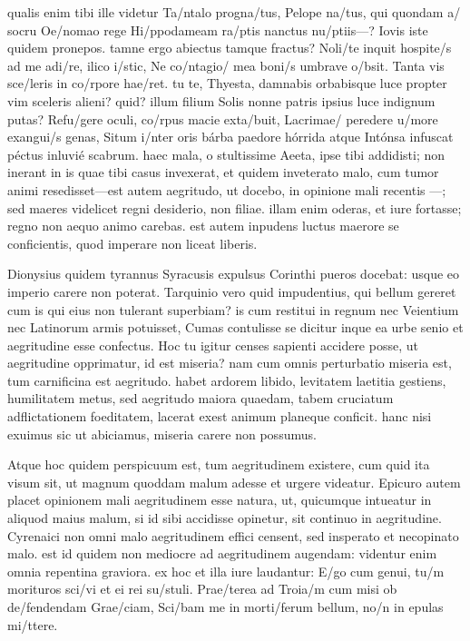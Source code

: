  qualis enim tibi ille videtur Ta/ntalo progna/tus, Pelope na/tus, qui quondam a/ socru Oe/nomao rege Hi/ppodameam ra/ptis nanctus nu/ptiis—? Iovis iste quidem pronepos. tamne ergo abiectus tamque fractus? Noli/te inquit hospite/s ad me adi/re, ilico i/stic, Ne co/ntagio/ mea boni/s umbrave o/bsit. Tanta vis sce/leris in co/rpore hae/ret. tu te, Thyesta, damnabis orbabisque luce propter vim sceleris alieni? quid? illum filium Solis nonne patris ipsius luce indignum putas? Refu/gere oculi, co/rpus macie exta/buit, Lacrimae/ peredere u/more exangui/s genas, Situm i/nter oris bárba paedore hórrida atque Intónsa infuscat péctus inluvié scabrum. haec mala, o stultissime Aeeta, ipse tibi addidisti; non inerant in is quae tibi casus invexerat, et quidem inveterato malo, cum tumor animi resedisset—est autem aegritudo, ut docebo, in opinione mali recentis —; sed maeres videlicet regni desiderio, non filiae. illam enim oderas, et iure fortasse; regno non aequo animo carebas. est autem inpudens luctus maerore se conficientis, quod imperare non liceat liberis.

 Dionysius quidem tyrannus Syracusis expulsus Corinthi pueros docebat: usque eo imperio carere non poterat. Tarquinio vero quid impudentius, qui bellum gereret cum is qui eius non tulerant superbiam? is cum restitui in regnum nec Veientium nec Latinorum armis potuisset, Cumas contulisse se dicitur inque ea urbe senio et aegritudine esse confectus. Hoc tu igitur censes sapienti accidere posse, ut aegritudine opprimatur, id est miseria? nam cum omnis perturbatio miseria est, tum carnificina est aegritudo. habet ardorem libido, levitatem laetitia gestiens, humilitatem metus, sed aegritudo maiora quaedam, tabem cruciatum adflictationem foeditatem, lacerat exest animum planeque conficit. hanc nisi exuimus sic ut abiciamus, miseria carere non possumus.

 Atque hoc quidem perspicuum est, tum aegritudinem existere, cum quid ita visum sit, ut magnum quoddam malum adesse et urgere videatur. Epicuro autem placet opinionem mali aegritudinem esse natura, ut, quicumque intueatur in aliquod maius malum, si id sibi accidisse opinetur, sit continuo in aegritudine. Cyrenaici non omni malo aegritudinem effici censent, sed insperato et necopinato malo. est id quidem non mediocre ad aegritudinem augendam: videntur enim omnia repentina graviora. ex hoc et illa iure laudantur: E/go cum genui, tu/m morituros sci/vi et ei rei su/stuli. Prae/terea ad Troia/m cum misi ob de/fendendam Grae/ciam, Sci/bam me in morti/ferum bellum, no/n in epulas mi/ttere.

